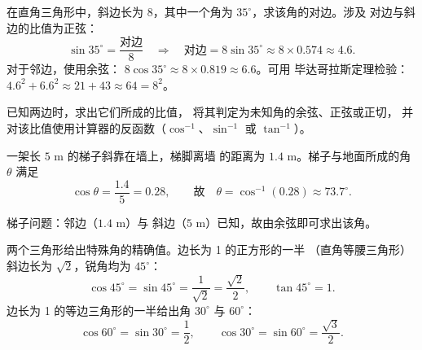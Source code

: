 \begin{example}\label{ex:g9:trig:side}
在直角三角形中，斜边长为 $8$，其中一个角为
$35^\circ$，求该角的对边。涉及
对边与斜边的比值为正弦：
\[
\sin 35^\circ = \frac{\text{对边}}{8}
\quad\Longrightarrow\quad
\text{对边} = 8 \sin 35^\circ \approx 8 \times 0.574 \approx 4.6 .
\]
对于邻边，使用余弦：
$8\cos 35^\circ \approx 8 \times 0.819 \approx 6.6$。可用
毕达哥拉斯定理检验：$4.6^2 + 6.6^2 \approx 21 + 43 \approx 64 = 8^2$。
\end{example}

\begin{method}[求角]\label{met:g9:trig:angle}
已知两边时，求出它们所成的比值，
将其判定为未知角的余弦、正弦或正切，
并对该比值使用计算器的反函数（$\cos^{-1}$、$\sin^{-1}$ 或 $\tan^{-1}$）。
\end{method}

\begin{example}\label{ex:g9:trig:angle}
一架长 $5$ m 的梯子斜靠在墙上，梯脚离墙
的距离为 $1.4$ m。梯子与地面所成的角 $\theta$ 满足
\[
\cos\theta = \frac{1.4}{5} = 0.28,
\qquad\text{故}\quad
\theta = \cos^{-1}(0.28) \approx 73.7^\circ .
\]
\end{example}

\begin{omfigure}

{\small 梯子问题：邻边（$1.4$ m）与
斜边（$5$ m）已知，故由余弦即可求出该角。}
\end{omfigure}

\begin{example}[特殊角]\label{ex:g9:trig:special}
两个三角形给出特殊角的精确值。边长为 1 的正方形的一半
（直角等腰三角形）斜边长为 $\sqrt2$，锐角均为 $45^\circ$：
\[
\cos 45^\circ = \sin 45^\circ = \frac{1}{\sqrt2} = \frac{\sqrt2}{2},
\qquad \tan 45^\circ = 1 .
\]
边长为 1 的等边三角形的一半给出角 $30^\circ$ 与
$60^\circ$：
\[
\cos 60^\circ = \sin 30^\circ = \frac12,
\qquad
\cos 30^\circ = \sin 60^\circ = \frac{\sqrt3}{2}.
\]
\end{example}

